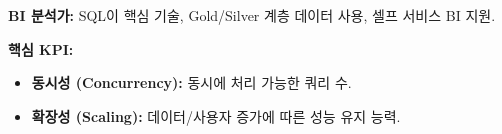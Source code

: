 \documentclass[11pt,a4paper]{article}
\begin{document}
\begin{tcolorbox}[mybox={CSCI103 Lecture 6 핵심 요약}]
\textbf{BI 분석가:} SQL이 핵심 기술, Gold/Silver 계층 데이터 사용, 셀프 서비스 BI 지원.

\textbf{핵심 KPI:}
\begin{itemize}
    \item \textbf{동시성 (Concurrency):} 동시에 처리 가능한 쿼리 수.
    \item \textbf{확장성 (Scaling):} 데이터/사용자 증가에 따른 성능 유지 능력.
\end{itemize}
\end{tcolorbox}
\end{document}
